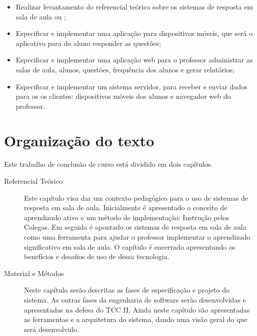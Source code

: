 \begin{itemize}
    \item Realizar levantamento do referencial te\'orico sobre os sistemas de resposta
    em sala de aula ou {\clickers};
    \item Especificar e implementar uma aplicação para dispositivos móveis, que será o
    aplicativo para do aluno responder as questões;
    \item Especificar e implementar uma aplicação web para o professor administrar as
    salas de aula, alunos, questões, frequência dos alunos e gerar relatórios;
    \item Especificar e implementar um sistema servidor, para receber e
    enviar dados para os os clientes: dispositivos móveis dos alunos e navegador
    web do professor.
\end{itemize}

\section{Organização do texto}
Este trabalho de conclusão de curso está dividido em dois capítulos.

\begin{description}
  \item[Referencial Teórico] Este capítulo visa dar um contexto pedagógico
  para o uso de sistemas de resposta em sala de aula. Inicialmente é
  apresentado o conceito de aprendizado ativo e um método de implementação: Instrução pelos Colegas.
  Em seguida é apontado os sistemas de resposta em sala de aula como uma
  ferramenta para ajudar o professor implementar o aprendizado significativo  em
  sala de aula. O capítulo é encerrado apresentando os benefícios e desafios de uso de dessa tecnologia.

  \item[Material e Métodos] Neste capítulo serão descritas as fases de especificação e projeto do sistema.
  As outras fases da engenharia de software serão desenvolvidas e apresentadas na
  defesa do TCC II. Ainda neste capítulo são apresentadas as ferramentas e a arquitetura
  do sistema, dando uma visão geral do que será desenvolvido.

\end{description}
